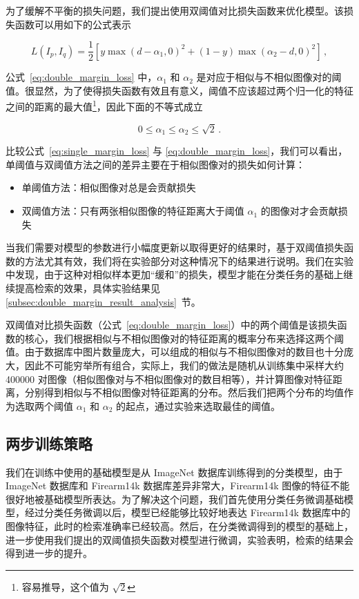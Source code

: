 为了缓解不平衡的损失问题，我们提出使用双阈值对比损失函数来优化模型。该损失函数可以用如下的公式表示

\begin{equation}\label{eq:double_margin_loss}
L(I_p, I_q) = \frac{1}{2}[y\max(d - {\alpha}_1, 0)^2 + (1-y)\max({\alpha}_2 - d, 0)^2]\, ,
\end{equation}

\noindent 公式~\ref{eq:double_margin_loss} 中，$\alpha_1$ 和 $\alpha_2$ 是对应于相似与不相似图像对的阈值。很显然，为了使得损失函数有效且有意义，阈值不应该超过两个归一化的特征之间的距离的最大值\footnote{容易推导，这个值为 $\sqrt{2}$}，因此下面的不等式成立

\begin{equation}
0 \leq \alpha_1 \leq \alpha_2 \leq \sqrt{2}\, .
\end{equation}

\noindent 比较公式~\ref{eq:single_margin_loss} 与 \ref{eq:double_margin_loss}，我们可以看出，单阈值与双阈值方法之间的差异主要在于相似图像对的损失如何计算：

\begin{itemize}
\item 单阈值方法：相似图像对总是会贡献损失
\item 双阈值方法：只有两张相似图像的特征距离大于阈值 $\alpha_1$ 的图像对才会贡献损失
\end{itemize}


当我们需要对模型的参数进行小幅度更新以取得更好的结果时，基于双阈值损失函数的方法尤其有效，我们将在实验部分对这种情况下的结果进行说明。我们在实验中发现，由于这种对相似样本更加“缓和”的损失，模型才能在分类任务的基础上继续提高检索的效果，具体实验结果见 \ref{subsec:double_margin_result_analysis}~节。

双阈值对比损失函数（公式~\ref{eq:double_margin_loss}）中的两个阈值是该损失函数的核心，我们根据相似与不相似图像对的特征距离的概率分布来选择这两个阈值。由于数据库中图片数量庞大，可以组成的相似与不相似图像对的数目也十分庞大，因此不可能穷举所有组合，实际上，我们的做法是随机从训练集中采样大约 400000 对图像（相似图像对与不相似图像对的数目相等），并计算图像对特征距离，分别得到相似与不相似图像对特征距离的分布。然后我们把两个分布的均值作为选取两个阈值 $\alpha_1$ 和 $\alpha_2$ 的起点，通过实验来选取最佳的阈值。

\subsection{两步训练策略}

我们在训练中使用的基础模型是从 ImageNet 数据库训练得到的分类模型，由于 ImageNet 数据库和 Firearm14k 数据库差异非常大，Firearm14k 图像的特征不能很好地被基础模型所表达。为了解决这个问题，我们首先使用分类任务微调基础模型，经过分类任务微调以后，模型已经能够比较好地表达 Firearm14k 数据库中的图像特征，此时的检索准确率已经较高。然后，在分类微调得到的模型的基础上，进一步使用我们提出的双阈值损失函数对模型进行微调，实验表明，检索的结果会得到进一步的提升。

